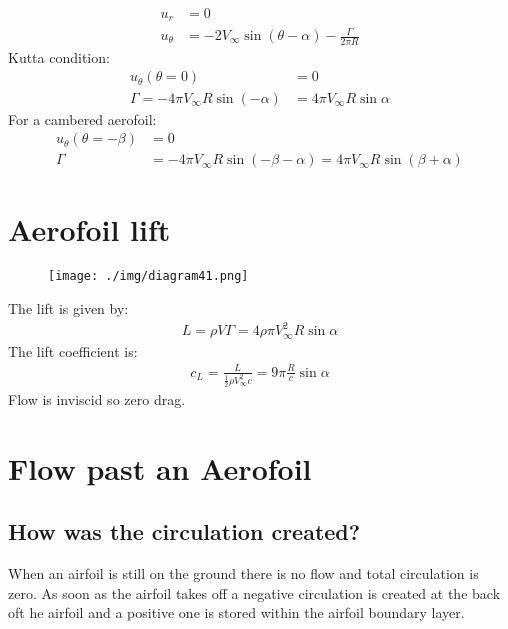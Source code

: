 \begin{align}
  u_r      & = 0                                                        \\
  u_\theta & = -2V_\infty \sin{(\theta-\alpha)} - \frac{\Gamma}{2\pi R}
\end{align}
Kutta condition:
\begin{align}
  u_\theta (\theta = 0)                     & = 0                           \\
  \Gamma = -4\pi V_\infty R \sin{(-\alpha)} & = 4\pi V_\infty R\sin{\alpha}
\end{align}
For a cambered aerofoil:
\begin{align}
  u_\theta (\theta = -\beta) & = 0                                                                                \\
  \Gamma                     & = -4\pi V_\infty R \sin{(-\beta -\alpha)} = 4\pi V_\infty R \sin{(\beta + \alpha)}
\end{align}
\section{Aerofoil lift}
\begin{figure}[H]
  \centering
  \texttt{[image: ./img/diagram41.png]}
\end{figure}
The lift is given by:
\begin{align}
  L = \rho V \Gamma = 4 \rho \pi V_\infty^2 R \sin{\alpha}
\end{align}
The lift coefficient is:
\begin{align}
  c_L = \frac{L}{\frac{1}{2}\rho V_\infty^2 c} = 9\pi \frac{R}{c}\sin{\alpha}
\end{align}
Flow is inviscid so zero drag.
\section{Flow past an Aerofoil}
\subsection{How was the circulation created?}
When an airfoil is still on the ground there is no flow and total circulation is zero. As soon as the airfoil takes off a negative circulation is created at the back oft he airfoil and a positive one is stored within the airfoil boundary layer.
